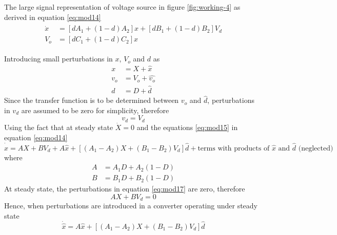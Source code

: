 \label{app:modelling}
	The large signal representation of voltage source in figure \ref{fig:working-4} as derived in equation \eqref{eq:mod14}
	\begin{align*}
		\begin{split}
			\dot{x} &= [dA_1+(1-d)A_2]x + [dB_1 + (1-d)B_2]V_d\\
			V_o &= [dC_1+(1-d)C_2]x
		\end{split}
	\end{align*}

	Introducing small perturbations in $x$, $V_o$ and $d$ as
	\begin{equation}
		\begin{split}
			x &= X + \hat{x}\\
			v_o &= V_o + \hat{v_o}\\
			d &= D + \hat{d}
		\end{split}
		\label{eq:mod15}
	\end{equation} 
	Since the transfer function is to be determined between $\hat{v_o}$ and $\hat{d}$, perturbations in $v_d$ are assumed to be zero for simplicity, therefore
	\begin{equation}
		v_d = V_d
		\label{eq:mod16}
	\end{equation}
	Using the fact that at steady state $\dot{X} = 0$ and the equations \eqref{eq:mod15} in equation \eqref{eq:mod14}
	\begin{equation}
		\dot{\hat{x}} = AX + BV_d + A\hat{x} + [(A_1-A_2)X+(B_1-B_2)V_d]\hat{d} + \text{terms with products of $\hat{x}$ and $\hat{d}$ (neglected)} 
		\label{eq:mod17}
	\end{equation}
	where
	\begin{align}
		A &= A_1D+A_2(1-D)\\
		B &= B_1D+B_2(1-D)
		\label{eq:mod18}
	\end{align}
	At steady state, the perturbations in equation \eqref{eq:mod17} are zero, therefore
	\begin{equation}
		AX+BV_d=0
		\label{eq:mod19}
	\end{equation}
	Hence, when perturbations are introduced in a converter operating under steady state
	\begin{equation}
		\dot{\hat{x}} = A\hat{x} + [(A_1-A_2)X+(B_1-B_2)V_d]\hat{d}
		\label{eq:mod20}
	\end{equation}

